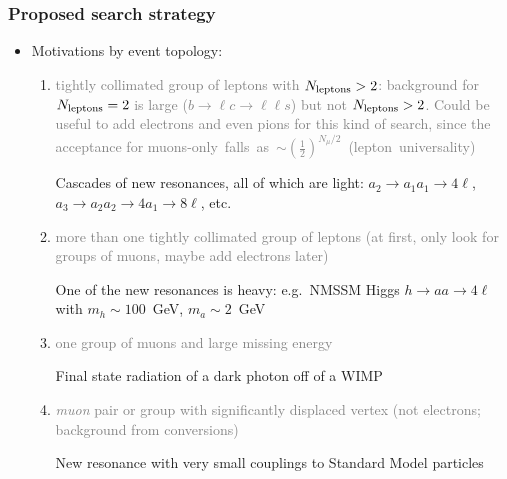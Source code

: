 \documentclass[compress]{beamer}
\begin{document}
\begin{frame}
\frametitle{Proposed search strategy}

\begin{itemize}
\item Motivations by event topology:
\begin{enumerate}
\item \textcolor{gray}{tightly collimated group of leptons with $N_{\mbox{\scriptsize
    leptons}} > 2$: background for $N_{\mbox{\scriptsize
    leptons}} = 2$ is large ($b \to \ell c \to \ell\ell s$) but not $N_{\mbox{\scriptsize
    leptons}} > 2$.
  Could be useful to add electrons and even pions for this kind of
  search, since the acceptance for \mbox{muons-only falls as
    $\sim\left(\frac{1}{2}\right)^{N_\mu/2}$ {\scriptsize (lepton universality)}\hspace{-1 cm}}}

Cascades of new resonances, all of which are light: $a_2 \to a_1 a_1 \to 4\ell$, $a_3 \to a_2 a_2 \to 4a_1 \to 8\ell$, etc.
\vspace{0.2 cm}
\item \textcolor{gray}{more than one tightly collimated group of leptons (at first, only look for groups of muons, maybe add electrons later)}

One of the new resonances is heavy: e.g.\ NMSSM Higgs $h \to a a \to 4\ell$ with $m_h \sim 100$~GeV, $m_a \sim 2$~GeV

\vspace{0.2 cm}
\item \textcolor{gray}{one group of muons and large missing energy}

Final state radiation of a dark photon off of a WIMP

\vspace{0.2 cm}
\item \textcolor{gray}{{\it muon} pair or group with significantly displaced vertex (not electrons; background from conversions)}

New resonance with very small couplings to Standard Model particles
\end{enumerate}
\end{itemize}
\end{frame}
\end{document}
